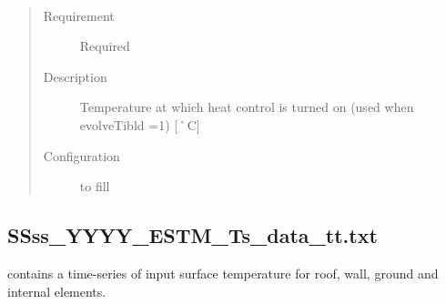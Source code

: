 \documentclass[letterpaper,10pt,english]{sphinxmanual}
\begin{document}
\begin{fulllineitems}
\label{\detokenize{input_files/ESTM_related_files/ESTMinput:cmdoption-arg-theat-on}}~\begin{quote}\begin{description}
\item[{Requirement}] \leavevmode
Required

\item[{Description}] \leavevmode
Temperature at which heat control is turned on (used when evolveTibld =1) {[}˚C{]}

\item[{Configuration}] \leavevmode
to fill

\end{description}\end{quote}

\end{fulllineitems}



\subsection{SSss\_YYYY\_ESTM\_Ts\_data\_tt.txt}
\label{\detokenize{input_files/ESTM_related_files/ESTM_related_files:id2}}\label{\detokenize{input_files/ESTM_related_files/ESTM_related_files:ssss-yyyy-estm-ts-data-tt-txt}}
{\hyperref[\detokenize{input_files/ESTM_related_files/ESTM_related_files:ssss-yyyy-estm-ts-data-tt-txt}]{}} contains a time-series of input surface
temperature for roof, wall, ground and internal elements.
\end{document}
